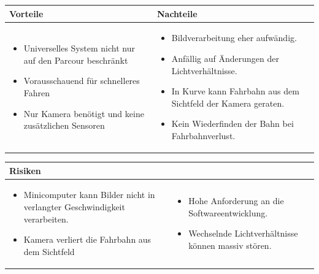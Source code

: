 \begin{table}[h]
\begin{tabular}{p{} | p{}}


 \textbf{Vorteile} & \textbf{Nachteile} \\ \hline
	 
\begin{itemize}
\item Universelles System nicht nur auf den Parcour beschränkt
\item Vorausschauend für schnelleres Fahren
\item Nur Kamera benötigt und keine zusätzlichen Sensoren
\end{itemize}

 
 &
 
\begin{itemize}
\item Bildverarbeitung eher aufwändig.
\item Anfällig auf Änderungen der Lichtverhältnisse.
\item In Kurve kann Fahrbahn aus dem Sichtfeld der Kamera geraten.
\item Kein Wiederfinden der Bahn bei Fahrbahnverlust.
\end{itemize}

\end{tabular}
\end{table}

\begin{table}[h]
\begin{tabular}{p{}p{}}


 \textbf{Risiken} & \\ \hline
	 
\begin{itemize}
\item Minicomputer kann Bilder nicht in verlangter Geschwindigkeit verarbeiten.
\item Kamera verliert die Fahrbahn aus dem Sichtfeld
\end{itemize}
&
\begin{itemize}
\item Hohe Anforderung an die Softwareentwicklung.
\item Wechselnde Lichtverhältnisse können massiv stören.
\end{itemize}

 
\end{tabular}
\end{table}

\pagebreak